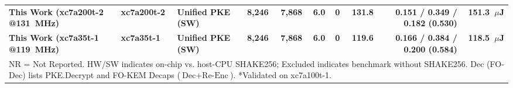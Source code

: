 \documentclass[journal]{IEEEtran}
\begin{document}
\begin{table}[t]
{\begin{tabular}{lllrrrrrrr}
\midrule
\textbf{This Work (xc7a200t-2 @131~MHz)} & \textbf{xc7a200t-2} & \textbf{Unified PKE (SW)} & \textbf{8,246} & \textbf{7,868} & \textbf{6.0} & \textbf{0} & \textbf{131.8} & \textbf{0.151 / 0.349 / 0.182 (0.530)} & \textbf{151.3~$\mu$J} \\
\textbf{This Work (xc7a35t-1 @119~MHz)} & \textbf{xc7a35t-1} & \textbf{Unified PKE (SW)} & \textbf{8,246} & \textbf{7,868} & \textbf{6.0} & \textbf{0} & \textbf{119.6} & \textbf{0.166 / 0.384 / 0.200 (0.584)} & \textbf{118.5~$\mu$J} \\
\bottomrule
\multicolumn{10}{l}{\footnotesize NR = Not Reported. HW/SW indicates on-chip vs. host-CPU SHAKE256; Excluded indicates benchmark without SHAKE256. Dec (FO-Dec) lists PKE.Decrypt and FO-KEM Decaps ($\text{Dec}+\text{Re-Enc}$). *Validated on xc7a100t-1.}
\end{tabular}%
}
\end{table}
\end{document}
